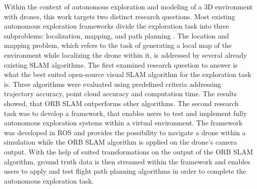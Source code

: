 Within the context of autonomous exploration and modeling of a 3D environment with drones, this work targets two distinct research questions. Most existing autonomous exploration frameworks divide the exploration task into three subproblems: localization, mapping, and path planning \cite{accurat}. The location and mapping problem, which refers to the task of generating a local map of the environment while localizing the drone within it, is addressed by several already existing SLAM algorithms. The first examined research question to answer is what the best suited open-source visual SLAM algorithm for the exploration task is. Three algorithms were evaluated using predefined criteria addressing trajectory accuracy, point cloud accuracy and computation time. The results showed, that ORB SLAM outperforms other algorithms. The second research task was to develop a framework, that enables users to test and implement fully autonomous exploration systems within a virtual environment. The framework was developed in ROS and provides the possibility to navigate a drone within a simulation while the ORB SLAM algorithm is applied on the drone's camera output. With the help of suited transformations on the output of the ORB SLAM algorithm, ground truth data is then streamed within the framework and enables users to apply and test flight path planning algorithms in order to complete the autonomous exploration task.